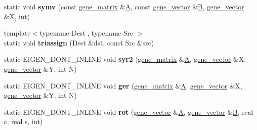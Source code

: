 \begin{DoxyCompactItemize}
\item 
\mbox{\label{classeigen3__interface_a5c5c3badd214379d6ed58d1cd161c8c9}} 
static void {\bfseries symv} (const \hyperlink{group___core___module_class_eigen_1_1_matrix}{gene\+\_\+matrix} \&\hyperlink{group___core___module_class_eigen_1_1_matrix}{A}, const \hyperlink{group___core___module_class_eigen_1_1_matrix}{gene\+\_\+vector} \&\hyperlink{group___core___module_class_eigen_1_1_matrix}{B}, \hyperlink{group___core___module_class_eigen_1_1_matrix}{gene\+\_\+vector} \&X, int)
\item 
\mbox{\label{classeigen3__interface_a31493192fd6d65ad4439ff34b179e659}} 
{\footnotesize template$<$typename Dest , typename Src $>$ }\\static void {\bfseries triassign} (Dest \&dst, const Src \&src)
\item 
\mbox{\label{classeigen3__interface_aee05e2263ef2aae953203af40f65c797}} 
static E\+I\+G\+E\+N\+\_\+\+D\+O\+N\+T\+\_\+\+I\+N\+L\+I\+NE void {\bfseries syr2} (\hyperlink{group___core___module_class_eigen_1_1_matrix}{gene\+\_\+matrix} \&\hyperlink{group___core___module_class_eigen_1_1_matrix}{A}, \hyperlink{group___core___module_class_eigen_1_1_matrix}{gene\+\_\+vector} \&X, \hyperlink{group___core___module_class_eigen_1_1_matrix}{gene\+\_\+vector} \&Y, int N)
\item 
\mbox{\label{classeigen3__interface_aaba801db7f10c7decb881a765030b10e}} 
static E\+I\+G\+E\+N\+\_\+\+D\+O\+N\+T\+\_\+\+I\+N\+L\+I\+NE void {\bfseries ger} (\hyperlink{group___core___module_class_eigen_1_1_matrix}{gene\+\_\+matrix} \&\hyperlink{group___core___module_class_eigen_1_1_matrix}{A}, \hyperlink{group___core___module_class_eigen_1_1_matrix}{gene\+\_\+vector} \&X, \hyperlink{group___core___module_class_eigen_1_1_matrix}{gene\+\_\+vector} \&Y, int N)
\item 
\mbox{\label{classeigen3__interface_af063f7eeab14f4eef3bb5788c165310a}} 
static E\+I\+G\+E\+N\+\_\+\+D\+O\+N\+T\+\_\+\+I\+N\+L\+I\+NE void {\bfseries rot} (\hyperlink{group___core___module_class_eigen_1_1_matrix}{gene\+\_\+vector} \&\hyperlink{group___core___module_class_eigen_1_1_matrix}{A}, \hyperlink{group___core___module_class_eigen_1_1_matrix}{gene\+\_\+vector} \&\hyperlink{group___core___module_class_eigen_1_1_matrix}{B}, real c, real s, int)

\end{DoxyCompactItemize}
